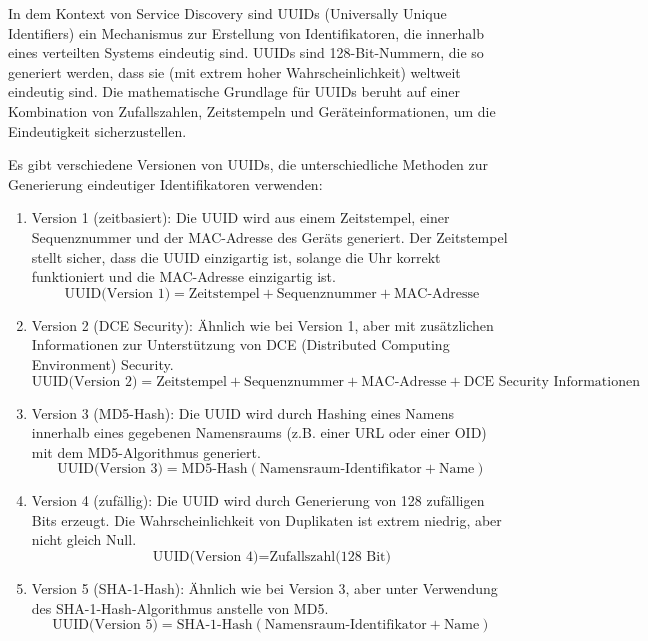 In dem Kontext von Service Discovery sind UUIDs (Universally Unique Identifiers) ein Mechanismus zur Erstellung von Identifikatoren, die innerhalb eines verteilten Systems eindeutig sind. UUIDs sind 128-Bit-Nummern, die so generiert werden, dass sie (mit extrem hoher Wahrscheinlichkeit) weltweit eindeutig sind. Die mathematische Grundlage für UUIDs beruht auf einer Kombination von Zufallszahlen, Zeitstempeln und Geräteinformationen, um die Eindeutigkeit sicherzustellen.

Es gibt verschiedene Versionen von UUIDs, die unterschiedliche Methoden zur Generierung eindeutiger Identifikatoren verwenden:

\begin{enumerate}
    \item Version 1 (zeitbasiert): Die UUID wird aus einem Zeitstempel, einer Sequenznummer und der MAC-Adresse des Geräts generiert. Der Zeitstempel stellt sicher, dass die UUID einzigartig ist, solange die Uhr korrekt funktioniert und die MAC-Adresse einzigartig ist.
    \begin{equation}
        \text{UUID(Version 1)} = \text{Zeitstempel} + \text{Sequenznummer} + \text{MAC-Adresse}
    \end{equation}
    \item Version 2 (DCE Security): Ähnlich wie bei Version 1, aber mit zusätzlichen Informationen zur Unterstützung von DCE (Distributed Computing Environment) Security.
    \begin{equation}
        \text{UUID(Version 2)} = \text{Zeitstempel} + \text{Sequenznummer} + \text{MAC-Adresse} + \text{DCE Security Informationen}
    \end{equation}
    \item Version 3 (MD5-Hash): Die UUID wird durch Hashing eines Namens innerhalb eines gegebenen Namensraums (z.B. einer URL oder einer OID) mit dem MD5-Algorithmus generiert.
    \begin{equation}
        \text{UUID(Version 3)} = \text{MD5-Hash}(\text{Namensraum-Identifikator} + \text{Name})
    \end{equation}
    \item Version 4 (zufällig): Die UUID wird durch Generierung von 128 zufälligen Bits erzeugt. Die Wahrscheinlichkeit von Duplikaten ist extrem niedrig, aber nicht gleich Null.
    \begin{equation}
        \text{UUID(Version 4)} = \text{Zufallszahl(128 Bit)}
    \end{equation}
    \item Version 5 (SHA-1-Hash): Ähnlich wie bei Version 3, aber unter Verwendung des SHA-1-Hash-Algorithmus anstelle von MD5.
    \begin{equation}
        \text{UUID(Version 5)} = \text{SHA-1-Hash}(\text{Namensraum-Identifikator} + \text{Name})
    \end{equation}
\end{enumerate}

